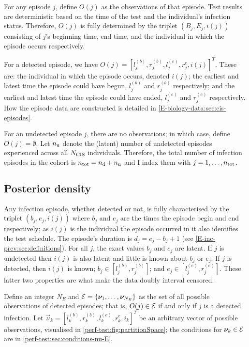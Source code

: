 \documentclass[thesis.tex]{subfiles}
\begin{document}
For any episode $j$, define $O(j)$ as the observations of that episode.
Test results are deterministic based on the time of the test and the individual's infection status.
Therefore, $O(j)$ is fully determined by the triplet $(B_j, E_j, i(j))$ consisting of $j$'s beginning time, end time, and the individual in which the episode occurs respectively.

For a detected episode, we have $O(j) = [l_j^{(b)}, r_j^{(b)}, l_j^{(e)}, r_j^{e}, i(j)]^T$.
These are: the individual in which the episode occurs, denoted $i(j)$; the earliest and latest time the episode could have begun, $l_j^{(b)}$ and $r_j^{(b)}$ respectively; and the earliest and latest time the episode could have ended, $l_j^{(e)}$ and $r_j^{(e)}$ respectively.
How the episode data are constructed is detailed in \cref{E-biology-data:sec:cis-episodes}.

For an undetected episode $j$, there are no observations; in which case, define $O(j) = \emptyset$.
Let $n_\text{u}$ denote the (latent) number of undetected episodes experienced across all $N_\text{CIS}$ individuals.
Therefore, the total number of infection episodes in the cohort is $n_\text{tot} = n_\text{d} + n_\text{u}$ and I index them with $j = 1, \dots, n_\text{tot}$.

\subsection{Posterior density} \label{perf-test:sec:posterior}

Any infection episode, whether detected or not, is fully characterised by the triplet $(b_j, e_j, i(j))$ where $b_j$ and $e_j$ are the times the episode begin and end respectively; as $i(j)$ is the individual the episode occurred in it also identifies the test schedule.
The episode's duration is $d_j = e_j - b_j + 1$ (see \cref{E-inc-prev:sec:definitions}).
For all $j$, the exact values $b_j$ and $e_j$ are latent.
If $j$ is undetected then $i(j)$ is also latent and little is known about $b_j$ or $e_j$.
If $j$ is detected, then $i(j)$ is known; $b_j \in [l_j^{(b)}, r_j^{(b)}]$; and $e_j \in [l_j^{(e)}, r_j^{(e)}]$.
These latter two properties are what make the data doubly interval censored.

Define an integer $N_E$ and $\mathcal{E} = \{ \bm{\nu}_1, \dots, \bm{\nu}_{N_E} \}$ as the set of all possible observations of detected episodes; that is, $O(j) \in \mathcal{E}$ if and only if $j$ is a detected infection.
Let $\vec{\nu}_k = [l^{(b)}_k, r^{(b)}_k, l^{(e)}_k, r^{e}_k, i_k]^T$ be an arbitrary vector of possible observations, visualised in \cref{perf-test:fig:partitionSpace}; the conditions for $\bm{\nu}_k \in \mathcal{E}$ are in \cref{perf-test:sec:conditions-nu-E}.
\end{document}
